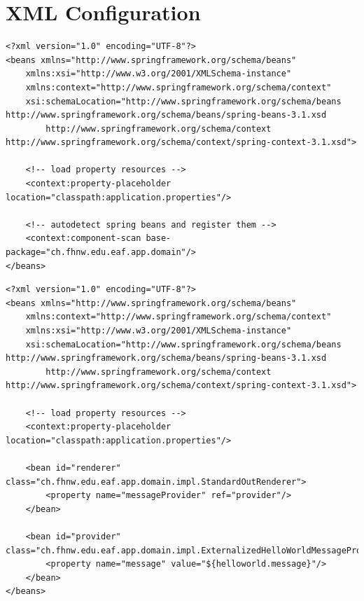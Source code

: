 \documentclass[a4paper,10pt]{scrreprt}
\begin{document}
\section{XML Configuration}
\begin{lstlisting}[caption=helloConfigWithAnnotationFormat.xml]
<?xml version="1.0" encoding="UTF-8"?>
<beans xmlns="http://www.springframework.org/schema/beans"
	xmlns:xsi="http://www.w3.org/2001/XMLSchema-instance"
	xmlns:context="http://www.springframework.org/schema/context"
	xsi:schemaLocation="http://www.springframework.org/schema/beans http://www.springframework.org/schema/beans/spring-beans-3.1.xsd
		http://www.springframework.org/schema/context http://www.springframework.org/schema/context/spring-context-3.1.xsd">
			
	<!-- load property resources -->
	<context:property-placeholder location="classpath:application.properties"/>
	
	<!-- autodetect spring beans and register them -->
	<context:component-scan base-package="ch.fhnw.edu.eaf.app.domain"/>
</beans>	
\end{lstlisting}

\begin{lstlisting}[caption="helloConfigWithApplicationContextWithXmlFormat.xml]
	<?xml version="1.0" encoding="UTF-8"?>
<beans xmlns="http://www.springframework.org/schema/beans"
	xmlns:context="http://www.springframework.org/schema/context"
	xmlns:xsi="http://www.w3.org/2001/XMLSchema-instance"
	xsi:schemaLocation="http://www.springframework.org/schema/beans http://www.springframework.org/schema/beans/spring-beans-3.1.xsd
		http://www.springframework.org/schema/context http://www.springframework.org/schema/context/spring-context-3.1.xsd">

	<!-- load property resources -->
	<context:property-placeholder location="classpath:application.properties"/>

	<bean id="renderer" class="ch.fhnw.edu.eaf.app.domain.impl.StandardOutRenderer">
		<property name="messageProvider" ref="provider"/>
	</bean>

	<bean id="provider" class="ch.fhnw.edu.eaf.app.domain.impl.ExternalizedHelloWorldMessageProvider">
		<property name="message" value="${helloworld.message}"/>
	</bean>
</beans>
\end{lstlisting}
\end{document}
